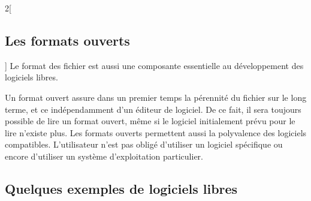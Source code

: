 \begin{multicols}{2}[\subsection{Les formats ouverts}]
Le format des fichier est aussi une composante essentielle au développement des logiciels libres.


Un \textcolor{Cdl}{format ouvert} assure dans un premier temps la pérennité du fichier sur le long terme, et ce indépendamment d’un éditeur de logiciel. De ce fait, il sera toujours possible de lire un format ouvert, même si le logiciel initialement prévu pour le lire n’existe plus. Les formats ouverts permettent aussi la polyvalence des logiciels compatibles. L’utilisateur n’est pas obligé d’utiliser un logiciel spécifique ou encore d’utiliser un système d’exploitation particulier.
\end{multicols}

\subsection{Quelques exemples de logiciels libres}

